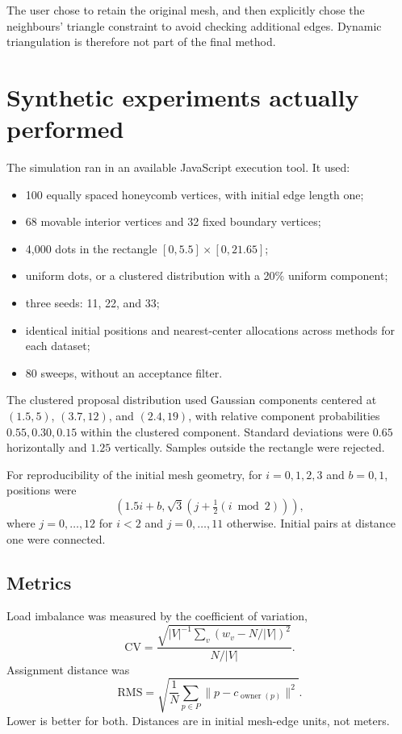 \documentclass[11pt]{article}
\begin{document}
The user chose to retain the original mesh, and then explicitly chose the neighbours' triangle constraint to avoid checking additional edges. Dynamic triangulation is therefore not part of the final method.

\section{Synthetic experiments actually performed}
The simulation ran in an available JavaScript execution tool. It used:
\begin{itemize}
\item 100 equally spaced honeycomb vertices, with initial edge length one;
\item 68 movable interior vertices and 32 fixed boundary vertices;
\item 4,000 dots in the rectangle $[0,5.5]\times[0,21.65]$;
\item uniform dots, or a clustered distribution with a 20\% uniform component;
\item three seeds: 11, 22, and 33;
\item identical initial positions and nearest-center allocations across methods for each dataset;
\item 80 sweeps, without an acceptance filter.
\end{itemize}
The clustered proposal distribution used Gaussian components centered at $(1.5,5)$, $(3.7,12)$, and $(2.4,19)$, with relative component probabilities $0.55,0.30,0.15$ within the clustered component. Standard deviations were $0.65$ horizontally and $1.25$ vertically. Samples outside the rectangle were rejected.

For reproducibility of the initial mesh geometry, for $i=0,1,2,3$ and $b=0,1$, positions were
\[
\left(1.5i+b,\sqrt{3}\left(j+\tfrac12(i\bmod2)\right)\right),
\]
where $j=0,\ldots,12$ for $i<2$ and $j=0,\ldots,11$ otherwise. Initial pairs at distance one were connected.

\subsection{Metrics}
Load imbalance was measured by the coefficient of variation,
\[
\mathrm{CV}=\frac{\sqrt{|V|^{-1}\sum_v(w_v-N/|V|)^2}}{N/|V|}.
\]
Assignment distance was
\[
\mathrm{RMS}=\sqrt{\frac1N\sum_{p\in P}\|p-c_{\operatorname{owner}(p)}\|^2}.
\]
Lower is better for both. Distances are in initial mesh-edge units, not meters.
\end{document}

